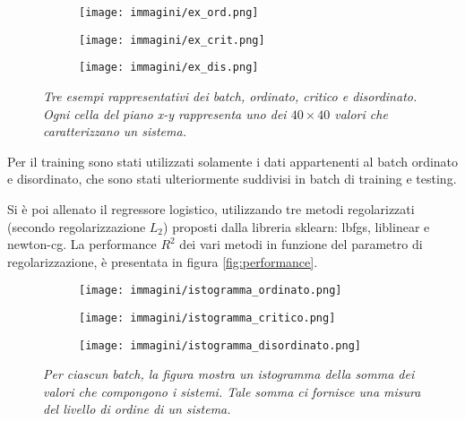 \documentclass{article}
\begin{document}
\begin{figure}[H]
    \centering
    \begin{subfigure}{.29\textwidth}
       \centering
       \texttt{[image: immagini/ex\_ord.png]}
    \end{subfigure}
    \begin{subfigure}{.29\textwidth}
       \centering
       \texttt{[image: immagini/ex\_crit.png]}
   \end{subfigure} 
   \begin{subfigure}{.29\textwidth}
    \centering
    \texttt{[image: immagini/ex\_dis.png]}
    \end{subfigure} 
   \caption{\emph{Tre esempi rappresentativi dei batch, ordinato, critico e disordinato. Ogni cella del piano x-y rappresenta uno dei $40\times40$ valori che caratterizzano un sistema.}}
   \label{fig:esempio_batch}
\end{figure}


Per il training sono stati utilizzati solamente i dati appartenenti al batch ordinato e disordinato, che sono stati ulteriormente suddivisi in batch di training e testing.

Si è poi allenato il regressore logistico, utilizzando tre metodi regolarizzati (secondo regolarizzazione $L_2$) proposti dalla libreria sklearn: lbfgs, liblinear e newton-cg. La performance $R^2$ dei vari metodi in funzione del parametro di regolarizzazione, è presentata in figura \ref{fig:performance}.
\begin{figure}[H]
   \centering
   \begin{subfigure}{.35\textwidth}
      \centering
      \texttt{[image: immagini/istogramma\_ordinato.png]}
   \end{subfigure}
   \begin{subfigure}{.35\textwidth}
      \centering
      \texttt{[image: immagini/istogramma\_critico.png]}
  \end{subfigure} 
  \begin{subfigure}{.35\textwidth}
   \centering
   \texttt{[image: immagini/istogramma\_disordinato.png]}
   \end{subfigure} 
  \caption{\emph{Per ciascun batch, la figura mostra un istogramma della somma dei valori che compongono i sistemi. Tale somma ci fornisce una misura del livello di ordine di un sistema.}}
  \label{fig:istogrammi}
\end{figure}
\end{document}
